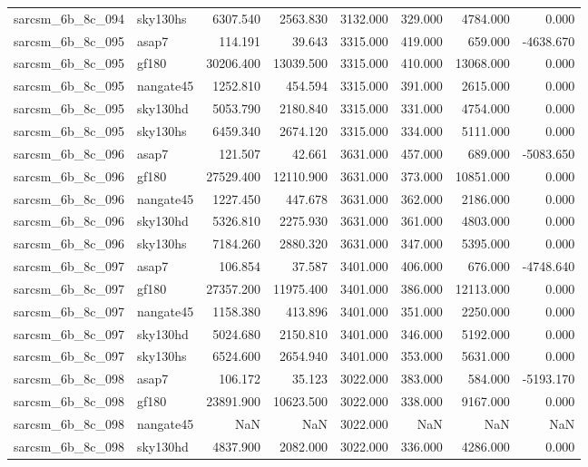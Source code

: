 \begin{tabular}{llrrrrrr}
sarcsm\_6b\_8c\_094 & sky130hs & 6307.540 & 2563.830 & 3132.000 & 329.000 & 4784.000 & 0.000 \\
sarcsm\_6b\_8c\_095 & asap7 & 114.191 & 39.643 & 3315.000 & 419.000 & 659.000 & -4638.670 \\
sarcsm\_6b\_8c\_095 & gf180 & 30206.400 & 13039.500 & 3315.000 & 410.000 & 13068.000 & 0.000 \\
sarcsm\_6b\_8c\_095 & nangate45 & 1252.810 & 454.594 & 3315.000 & 391.000 & 2615.000 & 0.000 \\
sarcsm\_6b\_8c\_095 & sky130hd & 5053.790 & 2180.840 & 3315.000 & 331.000 & 4754.000 & 0.000 \\
sarcsm\_6b\_8c\_095 & sky130hs & 6459.340 & 2674.120 & 3315.000 & 334.000 & 5111.000 & 0.000 \\
sarcsm\_6b\_8c\_096 & asap7 & 121.507 & 42.661 & 3631.000 & 457.000 & 689.000 & -5083.650 \\
sarcsm\_6b\_8c\_096 & gf180 & 27529.400 & 12110.900 & 3631.000 & 373.000 & 10851.000 & 0.000 \\
sarcsm\_6b\_8c\_096 & nangate45 & 1227.450 & 447.678 & 3631.000 & 362.000 & 2186.000 & 0.000 \\
sarcsm\_6b\_8c\_096 & sky130hd & 5326.810 & 2275.930 & 3631.000 & 361.000 & 4803.000 & 0.000 \\
sarcsm\_6b\_8c\_096 & sky130hs & 7184.260 & 2880.320 & 3631.000 & 347.000 & 5395.000 & 0.000 \\
sarcsm\_6b\_8c\_097 & asap7 & 106.854 & 37.587 & 3401.000 & 406.000 & 676.000 & -4748.640 \\
sarcsm\_6b\_8c\_097 & gf180 & 27357.200 & 11975.400 & 3401.000 & 386.000 & 12113.000 & 0.000 \\
sarcsm\_6b\_8c\_097 & nangate45 & 1158.380 & 413.896 & 3401.000 & 351.000 & 2250.000 & 0.000 \\
sarcsm\_6b\_8c\_097 & sky130hd & 5024.680 & 2150.810 & 3401.000 & 346.000 & 5192.000 & 0.000 \\
sarcsm\_6b\_8c\_097 & sky130hs & 6524.600 & 2654.940 & 3401.000 & 353.000 & 5631.000 & 0.000 \\
sarcsm\_6b\_8c\_098 & asap7 & 106.172 & 35.123 & 3022.000 & 383.000 & 584.000 & -5193.170 \\
sarcsm\_6b\_8c\_098 & gf180 & 23891.900 & 10623.500 & 3022.000 & 338.000 & 9167.000 & 0.000 \\
sarcsm\_6b\_8c\_098 & nangate45 & NaN & NaN & 3022.000 & NaN & NaN & NaN \\
sarcsm\_6b\_8c\_098 & sky130hd & 4837.900 & 2082.000 & 3022.000 & 336.000 & 4286.000 & 0.000 \\

\end{tabular}
